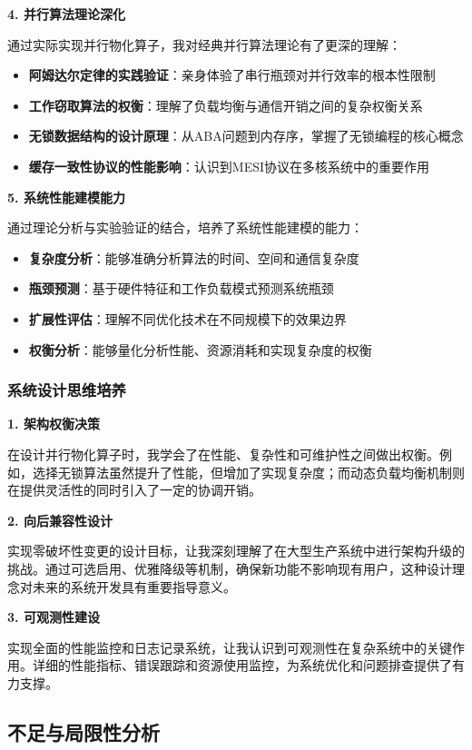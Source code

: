 \textbf{4. 并行算法理论深化}

通过实际实现并行物化算子，我对经典并行算法理论有了更深的理解：
\begin{itemize}
    \item \textbf{阿姆达尔定律的实践验证}：亲身体验了串行瓶颈对并行效率的根本性限制
    \item \textbf{工作窃取算法的权衡}：理解了负载均衡与通信开销之间的复杂权衡关系
    \item \textbf{无锁数据结构的设计原理}：从ABA问题到内存序，掌握了无锁编程的核心概念
    \item \textbf{缓存一致性协议的性能影响}：认识到MESI协议在多核系统中的重要作用
\end{itemize}

\textbf{5. 系统性能建模能力}

通过理论分析与实验验证的结合，培养了系统性能建模的能力：
\begin{itemize}
    \item \textbf{复杂度分析}：能够准确分析算法的时间、空间和通信复杂度
    \item \textbf{瓶颈预测}：基于硬件特征和工作负载模式预测系统瓶颈
    \item \textbf{扩展性评估}：理解不同优化技术在不同规模下的效果边界
    \item \textbf{权衡分析}：能够量化分析性能、资源消耗和实现复杂度的权衡
\end{itemize}

\subsubsection{系统设计思维培养}

\textbf{1. 架构权衡决策}

在设计并行物化算子时，我学会了在性能、复杂性和可维护性之间做出权衡。例如，选择无锁算法虽然提升了性能，但增加了实现复杂度；而动态负载均衡机制则在提供灵活性的同时引入了一定的协调开销。

\textbf{2. 向后兼容性设计}

实现零破坏性变更的设计目标，让我深刻理解了在大型生产系统中进行架构升级的挑战。通过可选启用、优雅降级等机制，确保新功能不影响现有用户，这种设计理念对未来的系统开发具有重要指导意义。

\textbf{3. 可观测性建设}

实现全面的性能监控和日志记录系统，让我认识到可观测性在复杂系统中的关键作用。详细的性能指标、错误跟踪和资源使用监控，为系统优化和问题排查提供了有力支撑。

\subsection{不足与局限性分析}

